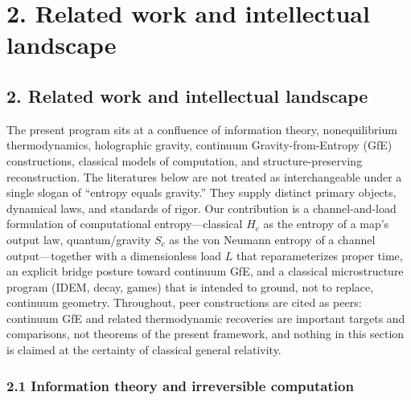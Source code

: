 \documentclass[
  11pt,
]{article}
\newcounter{none} %
\begin{document}
\section{2. Related work and intellectual
landscape}\label{related-work-and-intellectual-landscape}

\subsection{2. Related work and intellectual
landscape}\label{related-work-and-intellectual-landscape-1}

The present program sits at a confluence of information theory,
nonequilibrium thermodynamics, holographic gravity, continuum
Gravity-from-Entropy (GfE) constructions, classical models of
computation, and structure-preserving reconstruction. The literatures
below are not treated as interchangeable under a single slogan of
``entropy equals gravity.'' They supply distinct primary objects,
dynamical laws, and standards of rigor. Our contribution is a
channel-and-load formulation of computational entropy---classical
\(H_c\) as the entropy of a map's output law, quantum/gravity \(S_c\) as
the von Neumann entropy of a channel output---together with a
dimensionless load \(L\) that reparameterizes proper time, an explicit
bridge posture toward continuum GfE, and a classical microstructure
program (IDEM, decay, games) that is intended to ground, not to replace,
continuum geometry. Throughout, peer constructions are cited as peers:
continuum GfE and related thermodynamic recoveries are important targets
and comparisons, not theorems of the present framework, and nothing in
this section is claimed at the certainty of classical general
relativity.

\subsubsection{2.1 Information theory and irreversible
computation}\label{information-theory-and-irreversible-computation}
\end{document}
